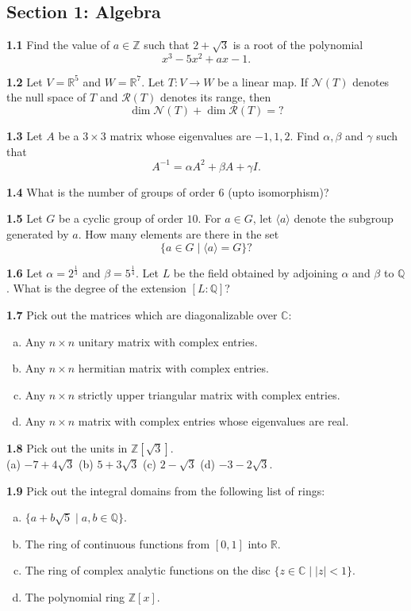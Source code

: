 \documentclass[11pt,a4paper]{article}
\newcommand{\Z}{\mathbb{Z}}
\newcommand{\Q}{\mathbb{Q}}
\newcommand{\R}{\mathbb{R}}
\newcommand{\C}{\mathbb{C}}
\newcommand{\examsec}[1]{%
  \subsection*{#1}
  \vspace{-2pt}
}
\newcommand{\qitem}[1]{\par\medskip\noindent\textbf{#1}\hspace{0.5em}}
\begin{document}
\examsec{Section 1: Algebra}

\qitem{1.1} Find the value of $a \in \Z$ such that $2 + \sqrt{3}$ is a root of the polynomial
\[
  x^3 - 5x^2 + ax - 1.
\]

\qitem{1.2} Let $V = \R^5$ and $W = \R^7$. Let $T : V \to W$ be a linear map. If $\mathcal{N}(T)$ denotes the null space of $T$ and $\mathcal{R}(T)$ denotes its range, then
\[
  \dim \mathcal{N}(T) + \dim \mathcal{R}(T) = ?
\]

\qitem{1.3} Let $A$ be a $3 \times 3$ matrix whose eigenvalues are $-1, 1, 2$. Find $\alpha, \beta$ and $\gamma$ such that
\[
  A^{-1} = \alpha A^2 + \beta A + \gamma I.
\]

\qitem{1.4} What is the number of groups of order $6$ (upto isomorphism)?

\qitem{1.5} Let $G$ be a cyclic group of order $10$. For $a \in G$, let $\langle a \rangle$ denote the subgroup generated by $a$. How many elements are there in the set
\[
  \{a \in G \mid \langle a \rangle = G\}?
\]

\qitem{1.6} Let $\alpha = 2^{\frac{1}{3}}$ and $\beta = 5^{\frac{1}{4}}$. Let $L$ be the field obtained by adjoining $\alpha$ and $\beta$ to $\Q$. What is the degree of the extension $[L : \Q]$?

\qitem{1.7} Pick out the matrices which are diagonalizable over $\C$:
\begin{enumerate}[(a)]
  \item Any $n \times n$ unitary matrix with complex entries.
  \item Any $n \times n$ hermitian matrix with complex entries.
  \item Any $n \times n$ strictly upper triangular matrix with complex entries.
  \item Any $n \times n$ matrix with complex entries whose eigenvalues are real.
\end{enumerate}

\qitem{1.8} Pick out the units in $\Z[\sqrt{3}]$.\\
(a) $-7 + 4\sqrt{3}$ \qquad (b) $5 + 3\sqrt{3}$ \qquad (c) $2 - \sqrt{3}$ \qquad (d) $-3 - 2\sqrt{3}$.

\qitem{1.9} Pick out the integral domains from the following list of rings:
\begin{enumerate}[(a)]
  \item $\{a + b\sqrt{5} \mid a, b \in \Q\}$.
  \item The ring of continuous functions from $[0, 1]$ into $\R$.
  \item The ring of complex analytic functions on the disc $\{z \in \C \mid |z| < 1\}$.
  \item The polynomial ring $\Z[x]$.
\end{enumerate}
\end{document}
